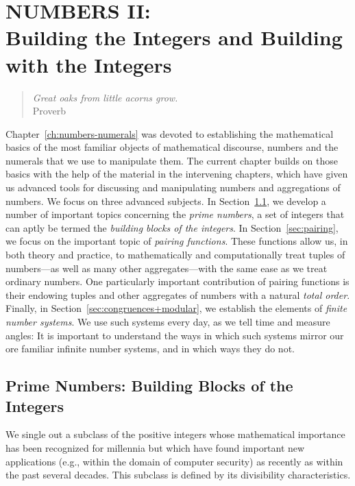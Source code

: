 
\chapter{NUMBERS II: \\
Building the Integers and Building with the Integers}
\label{ch:numbers-advanced}

\begin{quote}
{\em Great oaks from little acorns grow.} \\
\hspace*{2in}Proverb
\end{quote}

Chapter~\ref{ch:numbers-numerals} was devoted to establishing the
mathematical basics of the most familiar objects of mathematical
discourse, numbers and the numerals that we use to manipulate them.
The current chapter builds on those basics with the help of the
material in the intervening chapters, which have given us advanced
tools for discussing and manipulating numbers and aggregations of
numbers.  We focus on three advanced subjects.  In
Section~\ref{sec:primes}, we develop a number of important topics
concerning the {\em prime numbers}, a set of integers that can aptly
be termed the {\it building blocks of the integers}.  In
Section~\ref{sec:pairing}, we focus on the important topic of {\it
  pairing functions}.  These functions allow us, in both theory and
practice, to mathematically and computationally treat tuples of
 numbers---as well as many other aggregates---with
the same ease as we treat ordinary numbers.  One particularly
important contribution of pairing functions is their endowing tuples
and other aggregates of numbers with a natural {\em total order}.
Finally, in Section~\ref{sec:congruences+modular}, we establish the
elements of {\em finite number systems}.  We use such systems every
day, as we tell time and measure angles: It is important to understand
the ways in which such systems mirror our ore familiar infinite number
systems, and in which ways they do not.


\section{Prime Numbers: Building Blocks of the Integers}
\label{sec:primes}

We single out a subclass of the positive integers whose mathematical
importance has been recognized for millennia but which have found
important new applications (e.g., within the domain of computer
security) as recently as within the past several decades.  This
subclass is defined by its divisibility characteristics.

